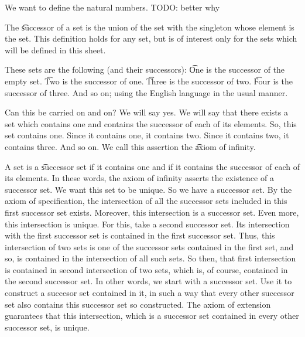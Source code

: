 
\sbasic











\sstart
{}


We want to define the natural numbers.
TODO: better why


The \t{successor} of a set is the union of the set with the singleton whose element is the set.
This definition holds for any set, but is of interest only for the sets which will be defined in this sheet.

These sets are the following (and their successors):
\t{One} is the successor of the empty set.
\t{Two} is the successor of one.
\t{Three} is the successor of two.
\t{Four} is the successor of three.
And so on; using the English language in the usual manner.

Can this be carried on and on?
We will say yes.
We will say that there exists a set which contains one and contains the successor of each of its elements.
So, this set contains one.
Since it contains one, it contains two.
Since it contains two, it contains three.
And so on.
We call this assertion the \t{axiom of infinity}.

A set is a \t{successor set} if it contains one and if it contains the successor of each of its elements.
In these words, the axiom of infinity asserts the existence of a successor set.
We want this set to be unique.
So we have a successor set.
By the axiom of specification, the intersection of all the successor sets included in this first successor set exists.
Moreover, this intersection is a successor set.
Even more, this intersection is unique.
For this, take a second successor set.
Its intersection with the first successor set is contained in the first successor set.
Thus, this intersection of two sets is one of the successor sets contained in the first set, and so, is contained in the intersection of all such sets.
So then, that first intersection is contained in second intersection of two sets, which is, of course, contained in the second successor set.
In other words, we start with a successor set.
Use it to construct a succesor set contained in it, in such a way that every other successor set also contains this successor set so constructed.
The axiom of extension guarantees that this intersection, which is a successor set contained in every other successor set, is unique.

